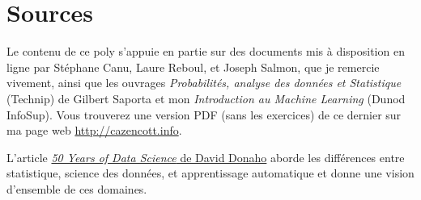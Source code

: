 \section{Sources}
Le contenu de ce poly s'appuie en partie sur des documents mis à disposition en
ligne par Stéphane Canu, Laure Reboul, et Joseph Salmon, que je remercie
vivement, ainsi que les ouvrages \textit{Probabilités, analyse des données et
  Statistique} (Technip) de Gilbert Saporta et mon \textit{Introduction au
  Machine Learning} (Dunod InfoSup). Vous trouverez une version PDF (sans les
exercices) de ce dernier sur ma page web \href{http://cazencott.info}{http://cazencott.info}.


\begin{plusloin}
  \item L'article \href{https://www.tandfonline.com/doi/full/10.1080/10618600.2017.1384734}{\textit{50 Years of Data Science} de David Donaho}
aborde les différences entre statistique, science des données, et apprentissage
automatique et donne une vision d'ensemble de ces domaines.
\end{plusloin}

